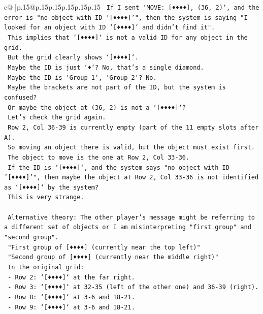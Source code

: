 \documentclass{article}
\begin{document}
{\begin{supertabular}{c@{$\;$}|p{.15\linewidth}@{}p{.15\linewidth}p{.15\linewidth}p{.15\linewidth}p{.15\linewidth}p{.15\linewidth}}
{{{\texttt{    If I sent `MOVE: {[}♦♦♦♦{]}, (36, 2)`, and the error is "no object with ID '{[}♦♦♦♦{]}'", then the system is saying "I looked for an object with ID '{[}♦♦♦♦{]}' and didn't find it".} \\
\texttt{    This implies that `{[}♦♦♦♦{]}` is not a valid ID for any object in the grid.} \\
\texttt{    But the grid clearly shows `{[}♦♦♦♦{]}`.} \\
\texttt{    Maybe the ID is just `♦`? No, that's a single diamond.} \\
\texttt{    Maybe the ID is `Group 1`, `Group 2`? No.} \\
\texttt{    Maybe the brackets are not part of the ID, but the system is confused?} \\
\texttt{    Or maybe the object at (36, 2) is not a `{[}♦♦♦♦{]}`?} \\
\texttt{    Let's check the grid again.} \\
\texttt{    Row 2, Col 36{-}39 is currently empty (part of the 11 empty slots after A).} \\
\texttt{    So moving an object there is valid, but the object must exist first.} \\
\texttt{    The object to move is the one at Row 2, Col 33{-}36.} \\
\texttt{    If the ID is `{[}♦♦♦♦{]}`, and the system says "no object with ID '{[}♦♦♦♦{]}'", then maybe the object at Row 2, Col 33{-}36 is not identified as `{[}♦♦♦♦{]}` by the system?} \\
\texttt{    This is very strange.} \\
\\ 
\texttt{    Alternative theory: The other player's message might be referring to a different set of objects or I am misinterpreting "first group" and "second group".} \\
\texttt{    "First group of {[}♦♦♦♦{]} (currently near the top left)"} \\
\texttt{    "Second group of {[}♦♦♦♦{]} (currently near the middle right)"} \\
\texttt{    In the original grid:} \\
\texttt{    {-} Row 2: `{[}♦♦♦♦{]}` at the far right.} \\
\texttt{    {-} Row 3: `{[}♦♦♦♦{]}` at 32{-}35 (left of the other one) and 36{-}39 (right).} \\
\texttt{    {-} Row 8: `{[}♦♦♦♦{]}` at 3{-}6 and 18{-}21.} \\
\texttt{    {-} Row 9: `{[}♦♦♦♦{]}` at 3{-}6 and 18{-}21.} \\
}}}
\end{supertabular}}
\end{document}
